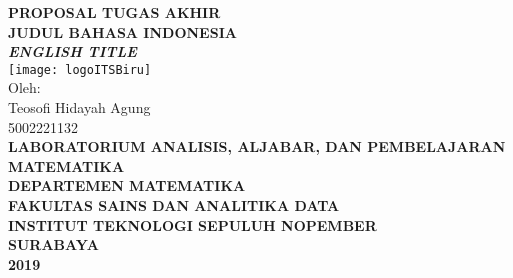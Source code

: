 \documentclass[12pt]{article}
\numberwithin{lemma}{subsection}
\begin{document}
	\begin{center}
		\textbf{PROPOSAL TUGAS AKHIR}\\
		\vspace{1cm}
		\textbf{JUDUL BAHASA INDONESIA}\\
		\vspace{1cm}
		\textbf{\textit{ENGLISH TITLE}}\\
		\vspace{2cm}
		\texttt{[image: logoITSBiru]}\\
		\vspace{3cm}
		Oleh:\\
		Teosofi Hidayah Agung\\
		5002221132\\
		\vspace{3.5cm}
		\textbf{
		LABORATORIUM ANALISIS, ALJABAR, DAN PEMBELAJARAN MATEMATIKA\\
		DEPARTEMEN MATEMATIKA\\
		FAKULTAS SAINS DAN ANALITIKA DATA\\
		INSTITUT TEKNOLOGI SEPULUH NOPEMBER\\
		SURABAYA\\
		2019}
		

	\end{center}
\pagebreak
{}
\end{document}
